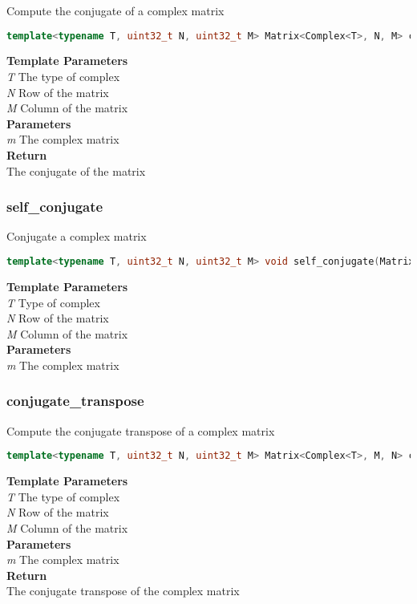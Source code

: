 \begin{mdframed}
Compute the conjugate of a complex matrix
\begin{lstlisting}[language=C++]
template<typename T, uint32_t N, uint32_t M> Matrix<Complex<T>, N, M> conjugate(Matrix<Complex<T>, N, M> m) 
\end{lstlisting}
\textbf{Template Parameters} \\ 
\textit{T} The type of complex \\ 
\textit{N} Row of the matrix \\ 
\textit{M} Column of the matrix \\ 
\textbf{Parameters} \\ 
\textit{m} The complex matrix \\ 
\textbf{Return} \\ 
The conjugate of the matrix\\ 
\end{mdframed}

\subsubsection{self\_conjugate}
\begin{mdframed}
Conjugate a complex matrix
\begin{lstlisting}[language=C++]
template<typename T, uint32_t N, uint32_t M> void self_conjugate(Matrix<Complex<T>, N, M>& m) 
\end{lstlisting}
\textbf{Template Parameters} \\ 
\textit{T} Type of complex \\ 
\textit{N} Row of the matrix \\ 
\textit{M} Column of the matrix \\ 
\textbf{Parameters} \\ 
\textit{m} The complex matrix \\ 
\end{mdframed}

\subsubsection{conjugate\_transpose}
\begin{mdframed}
Compute the conjugate transpose of a complex matrix
\begin{lstlisting}[language=C++]
template<typename T, uint32_t N, uint32_t M> Matrix<Complex<T>, M, N> conjugate_transpose(const Matrix<Complex<T>, N, M>& m) 
\end{lstlisting}
\textbf{Template Parameters} \\ 
\textit{T} The type of complex \\ 
\textit{N} Row of the matrix \\ 
\textit{M} Column of the matrix \\ 
\textbf{Parameters} \\ 
\textit{m} The complex matrix \\ 
\textbf{Return} \\ 
The conjugate transpose of the complex matrix\\ 
\end{mdframed}

